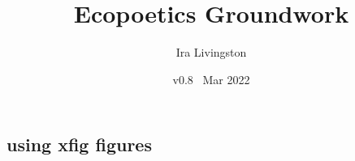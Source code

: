\documentclass[draft]{article}
\title{Ecopoetics Groundwork}
\author{Ira Livingston}
\date{v0.8 \ Mar 2022}
\begin{document}
\maketitle
\subsection{using xfig figures}
\def\coatpar#1{\shapepar{\coatshape}#1\par}
\def\coatshape{%
{25.1761}%
{0.176056}b{0.176056}\\%
{0.176056}t{0.176056}{50}\\%
{1.05634}t{0.176056}{0.880282}st{1.05634}{49.1197}\\%
{2.28873}t{0.176056}{0.352113}t{2.46479}{47.7113}\\%
{3.52113}t{0.176056}{1.46262}t{3.87324}{46.3028}\\%
{23.5915}t{0.176056}{19.5481}t{26.8109}{23.3652}\\%
{25.1761}t{0.459004}{20.6929}t{28.6217}{21.5543}\\%
{26.0563}t{0.616197}{21.3289}t{29.6278}{7.16801}st{36.7958}{13.1756}\\%
{28.5211}t{1.05634}{23.1098}t{32.4447}{1.88632}t{39.2606}{10.1376}\\%
{29.4014}t{1.33929}{23.6201}e{33.4507}t{40.1408}{9.05257}\\%
{32.7465}t{2.41449}{25.5591}t{36.6503}{11.7652}\\%
{33.4507}t{2.64085}{25.9673}t{35.9155}{12.1144}\\%
{34.331}t{3.14767}{26.2537}t{36.9312}{10.6166}\\%
{36.7958}t{4.56679}{22.3698}b{32.7465}t{39.7752}{6.42283}\\%
{37.5}t{4.97226}{21.2601}t{32.0423}{1.39245}t{40.5878}{5.22462}\\%
{39.2606}t{5.98592}{22.3592}t{30.2817}{4.87356}t{42.6192}{2.22908}\\%
{40.1408}t{6.62612}{22.7753}jt{29.4014}{6.61412}t{43.6349}{0.73131}\\%
{40.3169}t{6.75416}{29.4334}t{43.838}{0.377263}\\%
{44.5423}t{9.82715}{30.4898}jt{40.3169}{0.27666}\\%
{45.0704}t{10.2113}{29.9296}\\%
{49.2958}t{15.1408}{20.1344}\\%
{50.8803}t{17.5593}{15.8914}\\%
{52.6408}t{20.2465}{9.31246}\\%
{54.2254}e{26.0563}%
}
\end{document}
